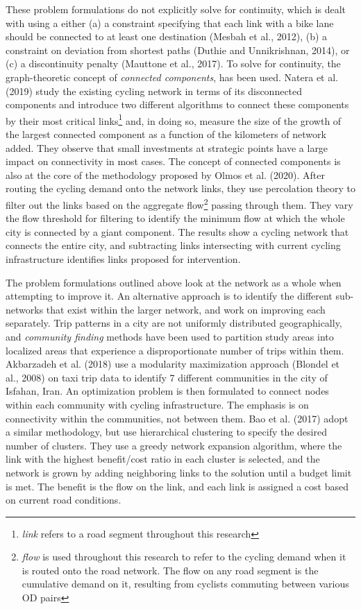 \documentclass[
]{article}
\begin{document}
These problem formulations do not explicitly solve for continuity, which
is dealt with using a either (a) a constraint specifying that each link
with a bike lane should be connected to at least one destination (Mesbah
et al., 2012), (b) a constraint on deviation from shortest paths (Duthie
and Unnikrishnan, 2014), or (c) a discontinuity penalty (Mauttone et
al., 2017). To solve for continuity, the graph-theoretic concept of
\emph{connected components}, has been used. Natera et al. (2019) study
the existing cycling network in terms of its disconnected components and
introduce two different algorithms to connect these components by their
most critical
links\footnote{\textit{link} refers to a road segment throughout this research}
and, in doing so, measure the size of the growth of the largest
connected component as a function of the kilometers of network added.
They observe that small investments at strategic points have a large
impact on connectivity in most cases. The concept of connected
components is also at the core of the methodology proposed by Olmos et
al. (2020). After routing the cycling demand onto the network links,
they use percolation theory to filter out the links based on the
aggregate
flow\footnote{\textit{flow} is used throughout this research to refer to the cycling demand when it is routed onto the road network. The flow on any road segment is the cumulative demand on it, resulting from cyclists commuting between various OD pairs}
passing through them. They vary the flow threshold for filtering to
identify the minimum flow at which the whole city is connected by a
giant component. The results show a cycling network that connects the
entire city, and subtracting links intersecting with current cycling
infrastructure identifies links proposed for intervention.

\vspace{0.3cm}

The problem formulations outlined above look at the network as a whole
when attempting to improve it. An alternative approach is to identify
the different sub-networks that exist within the larger network, and
work on improving each separately. Trip patterns in a city are not
uniformly distributed geographically, and \emph{community finding}
methods have been used to partition study areas into localized areas
that experience a disproportionate number of trips within them.
Akbarzadeh et al. (2018) use a modularity maximization approach (Blondel
et al., 2008) on taxi trip data to identify 7 different communities in
the city of Isfahan, Iran. An optimization problem is then formulated to
connect nodes within each community with cycling infrastructure. The
emphasis is on connectivity within the communities, not between them.
Bao et al. (2017) adopt a similar methodology, but use hierarchical
clustering to specify the desired number of clusters. They use a greedy
network expansion algorithm, where the link with the highest
benefit/cost ratio in each cluster is selected, and the network is grown
by adding neighboring links to the solution until a budget limit is met.
The benefit is the flow on the link, and each link is assigned a cost
based on current road conditions.
\end{document}
